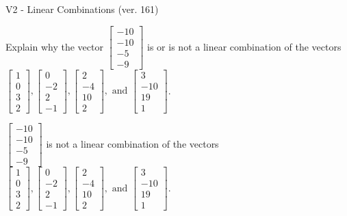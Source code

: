 \begin{exercise}
  \begin{exerciseTitle}V2 - Linear Combinations (ver. 161)\end{exerciseTitle}
  \begin{exerciseStatement}
    Explain why the vector \(\left[\begin{array}{c}
-10 \\
-10 \\
-5 \\
-9
\end{array}\right]\)  is or is not a linear 
	combination of the vectors \(\left[\begin{array}{c}
1 \\
0 \\
3 \\
2
\end{array}\right] , \left[\begin{array}{c}
0 \\
-2 \\
2 \\
-1
\end{array}\right] , \left[\begin{array}{c}
2 \\
-4 \\
10 \\
2
\end{array}\right] , \text{ and } \left[\begin{array}{c}
3 \\
-10 \\
19 \\
1
\end{array}\right]\).
	


  \end{exerciseStatement}
  \begin{exerciseAnswer}
   \(\left[\begin{array}{c}
-10 \\
-10 \\
-5 \\
-9
\end{array}\right]\) 
  	 is not  
	a linear combination of the vectors \(\left[\begin{array}{c}
1 \\
0 \\
3 \\
2
\end{array}\right] , \left[\begin{array}{c}
0 \\
-2 \\
2 \\
-1
\end{array}\right] , \left[\begin{array}{c}
2 \\
-4 \\
10 \\
2
\end{array}\right] , \text{ and } \left[\begin{array}{c}
3 \\
-10 \\
19 \\
1
\end{array}\right]\).


\end{exerciseAnswer}
\end{exercise}
